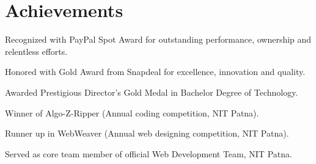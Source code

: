 \documentclass[]{rajnikant-resume-openfont}
\begin{document}
\begin{minipage}[t]{0.66\textwidth}

\section{Achievements} 
\sectionsep
\begin{tightemize}
	\item Recognized with PayPal Spot Award for outstanding performance, ownership and relentless efforts.
	\item Honored with Gold Award from Snapdeal for excellence, innovation and quality.
	\item Awarded Prestigious Director's Gold Medal in Bachelor Degree of Technology.
	\item Winner of Algo-Z-Ripper (Annual coding competition, NIT Patna).
	\item Runner up in WebWeaver (Annual web designing competition, NIT Patna).
	\item Served as core team member of official Web Development Team, NIT Patna.
	
\end{tightemize}
\sectionsep



\end{minipage} 
\end{document}
